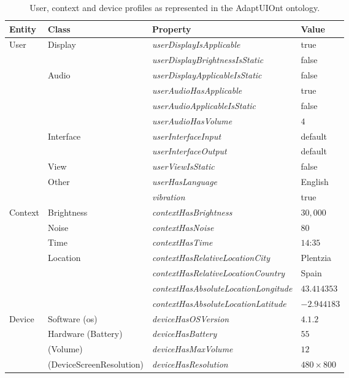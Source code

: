 \begin{itemize}
\begin{table}
 \caption{User, context and device profiles as represented in the AdaptUIOnt ontology.}
 \label{tbl:capabilities_collector_scenario}
 \footnotesize
 \centering
\begin{tabular}{l l l l}
  \hline 
  \textbf{Entity}& \textbf{Class} & \textbf{Property} 			& \textbf{Value}\\
  \hline
  User 		& Display 	& \textit{userDisplayIsApplicable} 	& true		\\%
		& 		& \textit{userDisplayBrightnessIsStatic}& false		\\
		& Audio 	& \textit{userDisplayApplicableIsStatic}& false		\\
		& 		& \textit{userAudioHasApplicable} 	& true		\\
		& 		& \textit{userAudioApplicableIsStatic} 	& false		\\
		& 		& \textit{userAudioHasVolume}  		& $4$ 		\\
		& Interface 	& \textit{userInterfaceInput}		& default	\\
		& 		& \textit{userInterfaceOutput} 		& default	\\
		& View		& \textit{userViewIsStatic}		& false		\\
		& Other 	& \textit{userHasLanguage}		& English	\\
		& 		& \textit{vibration} 			& true 		\\
  Context	& Brightness	& \textit{contextHasBrightness}		& $30,000$	\\
		& Noise		& \textit{contextHasNoise}		& $80$		\\
		& Time		& \textit{contextHasTime}		& $14$:$35$	\\
		& Location	& \textit{contextHasRelativeLocationCity}& Plentzia	\\
		&		& \textit{contextHasRelativeLocationCountry}& Spain	\\
		&		& \textit{contextHasAbsoluteLocationLongitude}& $43.414353$\\
		&		& \textit{contextHasAbsoluteLocationLatitude} & $-2.944183$\\
  Device	& Software (\ac{os})& \textit{deviceHasOSVersion}	& $4.1.2$	\\
		& Hardware (Battery)& \textit{deviceHasBattery}		& $55$		\\
		& (Volume)	& \textit{deviceHasMaxVolume}		& $12$		\\
		& (DeviceScreenResolution) & \textit{deviceHasResolution}& $480×800$	\\	
  \hline
\end{tabular}
\end{table}


\end{itemize}
